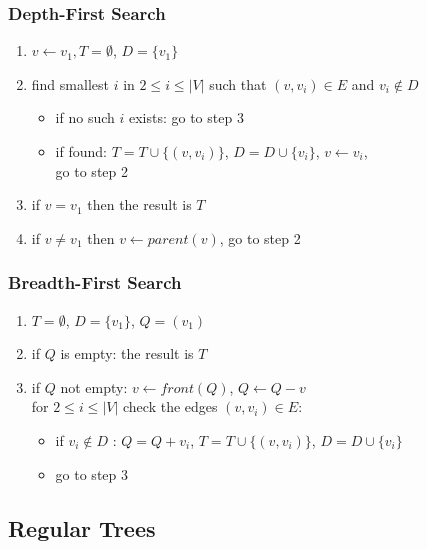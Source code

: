 \documentclass[dvipsnames]{beamer}
\begin{document}
\begin{frame}
  \frametitle{Depth-First Search}

  \begin{enumerate}
    \item $v \leftarrow v_1, T=\emptyset$, $D=\{v_1\}$

    \pause
    \item find smallest $i$ in $2 \leq i \leq |V|$
      such that $(v,v_i) \in E$ and $v_i \notin D$
      \begin{itemize}
        \item if no such $i$ exists: go to step 3
        \item if found: $T=T \cup \{(v,v_i)\}$, $D=D \cup \{v_i\}$,
          $v \leftarrow v_i$,\\
          go to step 2
      \end{itemize}

    \pause
    \item if $v=v_1$ then the result is $T$

    \pause
    \item if $v \neq v_1$ then $v \leftarrow parent(v)$, go to step 2
  \end{enumerate}
\end{frame}

\begin{frame}
  \frametitle{Breadth-First Search}

  \begin{enumerate}
    \item $T=\emptyset$, $D=\{v_1\}$, $Q=(v_1)$

    \pause
    \item if $Q$ is empty: the result is $T$
    \item if $Q$ not empty: $v \leftarrow front(Q)$, $Q \leftarrow Q - v$\\
      for $2 \leq i \leq |V|$ check the edges $(v,v_i) \in E$:
    \begin{itemize}
      \item if $v_i \notin D$ : $Q = Q + v_i$, $T = T \cup \{(v,v_i)\}$,
        $D=D \cup \{v_i\}$
       \item go to step 3
    \end{itemize}
  \end{enumerate}
\end{frame}

\subsection{Regular Trees}
\end{document}
